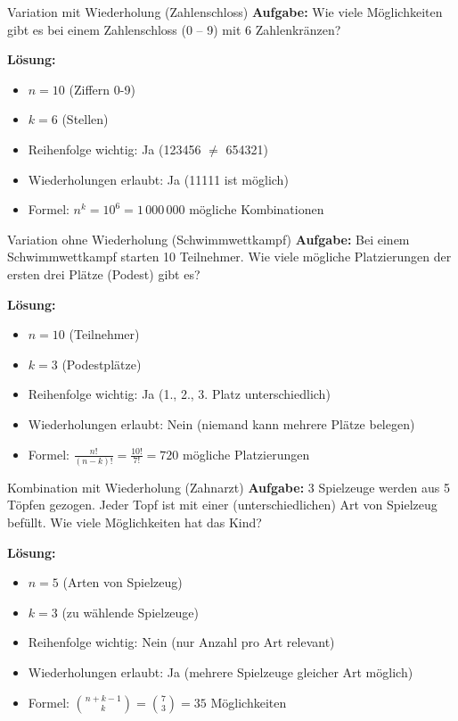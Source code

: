 \begin{example2}{Variation mit Wiederholung (Zahlenschloss)}
\textbf{Aufgabe:} Wie viele Möglichkeiten gibt es bei einem Zahlenschloss (0 -- 9) mit 6 Zahlenkränzen?

\textbf{Lösung:}
\begin{itemize}
\item $n = 10$ (Ziffern 0-9)
\item $k = 6$ (Stellen)
\item Reihenfolge wichtig: Ja (123456 $\neq$ 654321)
\item Wiederholungen erlaubt: Ja (11111 ist möglich)
\item Formel: $n^k = 10^6 = 1\,000\,000$ mögliche Kombinationen
\end{itemize}
\end{example2}

\begin{example2}{Variation ohne Wiederholung (Schwimmwettkampf)}
\textbf{Aufgabe:} Bei einem Schwimmwettkampf starten 10 Teilnehmer. Wie viele mögliche Platzierungen der ersten drei Plätze (Podest) gibt es?

\textbf{Lösung:}
\begin{itemize}
\item $n = 10$ (Teilnehmer)
\item $k = 3$ (Podestplätze)
\item Reihenfolge wichtig: Ja (1., 2., 3. Platz unterschiedlich)
\item Wiederholungen erlaubt: Nein (niemand kann mehrere Plätze belegen)
\item Formel: $\frac{n!}{(n-k)!} = \frac{10!}{7!} = 720$ mögliche Platzierungen
\end{itemize}
\end{example2}

\begin{example2}{Kombination mit Wiederholung (Zahnarzt)}
\textbf{Aufgabe:} 3 Spielzeuge werden aus 5 Töpfen gezogen. Jeder Topf ist mit einer (unterschiedlichen) Art von Spielzeug befüllt. Wie viele Möglichkeiten hat das Kind?

\textbf{Lösung:}
\begin{itemize}
\item $n = 5$ (Arten von Spielzeug)
\item $k = 3$ (zu wählende Spielzeuge)
\item Reihenfolge wichtig: Nein (nur Anzahl pro Art relevant)
\item Wiederholungen erlaubt: Ja (mehrere Spielzeuge gleicher Art möglich)
\item Formel: $\binom{n+k-1}{k} = \binom{7}{3} = 35$ Möglichkeiten
\end{itemize}
\end{example2}


